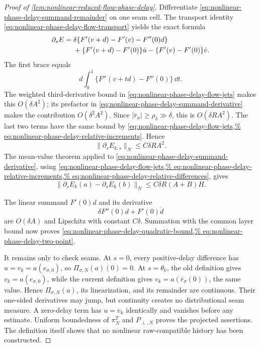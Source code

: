 \begin{proof}[Proof of
\cref{lem:nonlinear-reduced-flow-phase-delay}]
Differentiate
\cref{eq:nonlinear-phase-delay-summand-remainder} on one seam cell.
The transport identity
\cref{eq:nonlinear-phase-delay-flow-transport} yields the exact formula
\begin{align}
 \partial_sE={}&
 \delta\{F'(v+d)-F'(v)-F''(0)d\}\notag\\
 &+\{F'(v+d)-F'(0)\}\dot u
   -\{F'(v)-F'(0)\}\dot v.                        \label{eq:nonlinear-phase-delay-summand-derivative}
\end{align}
The first brace equals
\[
 d\int_0^1\{F''(v+td)-F''(0)\}\,\dd t.
\]
The weighted third-derivative bound in
\cref{eq:nonlinear-phase-delay-flow-jets} makes this
\(O(\delta A^2)\); its prefactor in
\cref{eq:nonlinear-phase-delay-summand-derivative} makes the contribution
\(O(\delta^2A^2)\).  Since
\(|\bar r_\sigma|\ge\rho_\delta\gg\delta\), this is
\(O(\delta R A^2)\).  The last two terms have the same bound by
\cref{eq:nonlinear-phase-delay-flow-jets,%
eq:nonlinear-phase-delay-relative-increments}.  Hence
\begin{equation}
 \|\partial_sE_{k,s}\|_N\le C\delta R A^2.         \label{eq:nonlinear-phase-delay-summand-derivative-bound}
\end{equation}
The mean-value theorem applied to
\cref{eq:nonlinear-phase-delay-summand-derivative}, using
\cref{eq:nonlinear-phase-delay-flow-jets,%
eq:nonlinear-phase-delay-relative-increments,%
eq:nonlinear-phase-delay-relative-differences}, gives
\begin{equation}
 \|\partial_sE_k(a)-\partial_sE_k(b)\|_N
 \le C\delta R(A+B)H.                             \label{eq:nonlinear-phase-delay-summand-derivative-two-point}
\end{equation}

The linear summand \(F'(0)d\) and its derivative
\[
 \delta F''(0)d+F'(0)\dot d
\]
are \(O(\delta A)\) and Lipschitz with constant \(C\delta\).  Summation
with the common layer bound now proves
\cref{eq:nonlinear-phase-delay-quadratic-bound,%
eq:nonlinear-phase-delay-two-point}.

It remains only to check seams.  At \(s=0\), every positive-delay
difference has
\(u=v_k=a(e_{\sigma,0})\), so \(\Pi_{\sigma,N}(a)(0)=0\).  At
\(s=\theta_k\), the old definition gives
\(v_k=a(e_{\sigma,0})\), while the current definition gives
\(v_k=a(\bar r_\sigma(0))\), the same value.  Hence
\(\Pi_{\sigma,N}(a)\), its linearization, and its remainder are continuous.
Their one-sided derivatives may jump, but continuity creates no
distributional seam measure.  A zero-delay term has \(u=v_k\) identically
and vanishes before any estimate.  Uniform boundedness of
\(\pi_N^T\) and \(P_{\perp,N}\) proves the projected assertions.  The
definition itself shows that no nonlinear raw-compatible history has been
constructed.
\end{proof}

